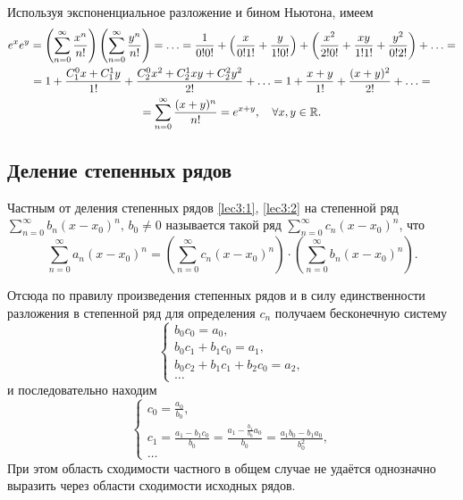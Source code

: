 \documentclass[../../main.tex]{subfiles}
\begin{document}
    \begin{example}
        Используя экспоненциальное разложение и бином Ньютона, имеем
        \begin{multline*} 
            e^xe^y = \left(\sum\limits_{n = 0}^{\infty}\frac{x^n}{n!} \right)
            \left(\sum\limits_{n = 0}^{\infty}\frac{y^n}{n!} \right) = \ldots = 
            \frac{1}{0!0!} + \left(\frac x{0!1!} + \frac y {1!0!}\right) + 
            \left(\frac{x^2}{2!0!} + \frac{xy}{1!1!} + \frac{y^2}{0!2!}\right) 
            + \ldots = \\ = 1 + \frac{C_1^0 x + C_1^1 y}{1!} + \frac{C_2^0 x^2 
            + C_2^1xy + C_2^2 y^2}{2!} + \ldots = 1 + \frac{x + y}{1!} + 
            \frac{(x + y)^2}{2!} + \ldots = \\ = \sum\limits_{n = 0}^{\infty} 
            \frac{(x + y)^n}{n!} = e^{x + y}, \quad \forall x, y \in \mathbb{R}.
        \end{multline*}
    \end{example}

    \subsection{Деление степенных рядов}

    Частным от деления степенных рядов \eqref{lec3:1}, \eqref{lec3:2} на 
    степенной ряд $\sum\limits_{n = 0}^{\infty}b_n(x - x_0)^n, \, b_0 
    \ne 0$ называется такой ряд $\sum\limits_{n = 0}^{\infty}c_n(x - x_0)^n$, 
    что 
    \[\sum\limits_{n = 0}^{\infty}a_n(x - x_0)^n = 
    \left(\sum\limits_{n = 0}^{\infty}c_n(x - x_0)^n\right) \cdot 
    \left(\sum\limits_{n = 0}^{\infty}b_n(x - x_0)^n\right). \]
    
    Отсюда по правилу произведения степенных рядов и в силу единственности 
    разложения в степенной ряд для определения $c_n$ получаем бесконечную систему 
    \[
    \begin{cases}
        b_0c_0 = a_0, \\ 
        b_0c_1 + b_1c_0 = a_1, \\
        b_0c_2 + b_1c_1 + b_2c_0 = a_2, \\
        \ldots
    \end{cases} 
    \]
    и последовательно находим
    \[ 
    \begin{cases}
    c_0 = \frac{a_0}{b_0}, \\ 
    c_1 = \frac{a_1 - b_1c_0}{b_0} = \frac{a_1 - \frac{b_1}{b_0}a_0}{b_0} = 
        \frac{a_1b_0-b_1a_0}{b_0^2}, \\
    \ldots
    \end{cases} 
    \]
    При этом область сходимости частного в общем случае не удаётся однозначно 
    выразить через области сходимости исходных рядов.
\end{document}
